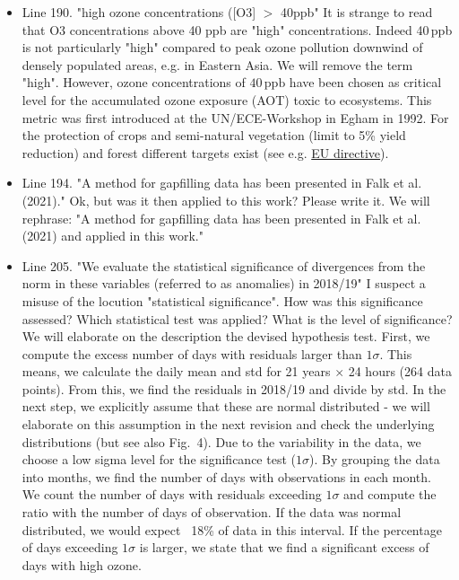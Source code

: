 \documentclass{scrartcl}
\begin{document}
\begin{itemize}
\item {\color{blue}Line 190. "high ozone concentrations ([O3] $>$ 40ppb" It is strange to read that O3 concentrations above 40 ppb are "high" concentrations.}
Indeed 40\,ppb is not particularly "high" compared to peak ozone pollution downwind of densely populated areas, e.g. in Eastern Asia. We will remove the term "high". However, ozone concentrations of $40\,\mathrm{ppb}$ have been chosen as critical level for the accumulated ozone exposure (AOT) toxic to ecosystems. This metric was first introduced at the UN/ECE-Workshop in Egham in 1992. For the protection of crops and semi-natural vegetation (limit to 5\% yield reduction) and forest different targets exist (see e.g. \href{https://www.eea.europa.eu/publications/TOP08-98/page008.html}{EU directive}).

\item {\color{blue}Line 194. "A method for gapfilling data has been presented in Falk et al. (2021)."
Ok, but was it then applied to this work? Please write it.}
We will rephrase: "A method for gapfilling data has been presented in Falk et al. (2021) and applied in this work."

\item {\color{blue}Line 205. "We evaluate the statistical significance of divergences from the norm in these variables (referred to as anomalies) in 2018/19"
I suspect a misuse of the locution "statistical significance". How was this significance assessed? Which statistical test was applied? What is the level of significance?}
We will elaborate on the description the devised hypothesis test. First, we compute the excess number of days with residuals larger than $1\sigma$. This means, we calculate the daily mean and std for 21 years $\times$ 24 hours (264 data points).
From this, we find the residuals in 2018/19 and divide by std. In the next step, we explicitly assume that these are normal distributed - we will elaborate on this assumption in the next revision and check the underlying distributions (but see also Fig.~4). Due to the variability in the data, we choose a low sigma level for the significance test ($1\sigma$). By grouping the data into months, we find the number of days with observations in each month. We count the number of days with residuals exceeding $1\sigma$ and compute the ratio with the number of days of observation. If the data was normal distributed, we would expect ~18\% of data in this interval. If the percentage of days exceeding $1\sigma$ is larger, we state that we find a significant excess of days with high ozone.


\end{itemize}
\end{document}
